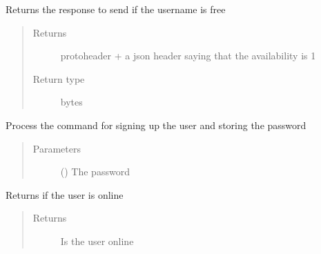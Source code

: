 \documentclass[letterpaper,10pt,english]{sphinxmanual}
\begin{document}
\begin{fulllineitems}
\begin{fulllineitems}
\label{\detokenize{Message:Message.Message._signup_uid_available}}
Returns the response to send if the username is free
\begin{quote}\begin{description}
\item[{Returns}] \leavevmode
protoheader + a json header saying that the availability is 1

\item[{Return type}] \leavevmode
bytes

\end{description}\end{quote}

\end{fulllineitems}


\begin{fulllineitems}
\label{\detokenize{Message:Message.Message._process_signup_pass}}
Process the command for signing up the user and storing the password
\begin{quote}\begin{description}
\item[{Parameters}] \leavevmode
{} () \textendash{} The password

\end{description}\end{quote}

\end{fulllineitems}


\begin{fulllineitems}
\label{\detokenize{Message:Message.Message.isOnline}}
Returns if the user is online
\begin{quote}\begin{description}
\item[{Returns}] \leavevmode
Is the user online


\end{description}
\end{quote}
\end{fulllineitems}
\end{fulllineitems}
\end{document}
